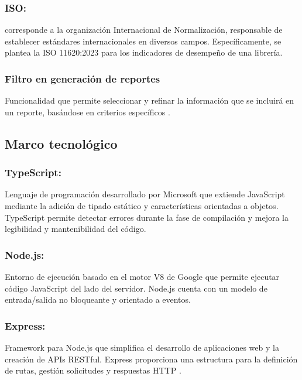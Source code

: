 \documentclass[spanish]{ieee_upb}
\begin{document}
  \subsubsection{ISO: } corresponde a la  organización Internacional de Normalización, responsable de establecer estándares internacionales en diversos campos\cite{iso_standards_2019}. Específicamente, se plantea la ISO 11620:2023 para los indicadores de desempeño de una librería\cite{iso11620_2023Library}.  

  \subsubsection{Filtro en generación de reportes} Funcionalidad que permite seleccionar y refinar la información que se incluirá en un reporte, basándose en criterios específicos \cite{ibm_report_filter_2021}.
\subsection{Marco tecnológico}

    \subsubsection{TypeScript:} Lenguaje de programación desarrollado por Microsoft que extiende JavaScript mediante la adición de tipado estático y características orientadas a objetos. TypeScript permite detectar errores durante la fase de compilación y mejora la legibilidad y mantenibilidad del código\cite{typescript_2020}.
  
  \subsubsection{Node.js:} Entorno de ejecución basado en el motor V8 de Google que permite ejecutar código JavaScript del lado del servidor. Node.js cuenta con un modelo de entrada/salida no bloqueante y orientado a eventos\cite{nodejs_2020}.
  
  \subsubsection{Express:} Framework para Node.js que simplifica el desarrollo de aplicaciones web y la creación de APIs RESTful. Express proporciona una estructura para la definición de  rutas, gestión solicitudes y respuestas HTTP \cite{express_framework_2020}.
\end{document}
